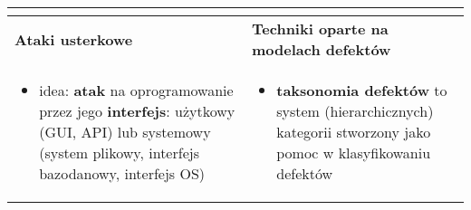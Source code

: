 \documentclass[../main.tex]{subfiles}
\begin{document}
\begin{table}[H]
\begin{center}
\begin{tabular}{| p{8cm} | p{8cm} |}
\begin{itemize}
                \end{itemize}\\
                \hline
                \hline
                \textbf{Ataki usterkowe} & \textbf{Techniki oparte na modelach defektów}\\
                \hline
                \begin{itemize}
                    \item idea: \textbf{atak} na oprogramowanie przez jego \textbf{interfejs}: użytkowy (GUI, API)
                    lub systemowy (system plikowy, interfejs bazodanowy, interfejs OS)
                \end{itemize}
                &
                \begin{itemize}
                    \item \textbf{taksonomia defektów} to system (hierarchicznych) kategorii
                    stworzony jako pomoc w klasyfikowaniu defektów
                \end{itemize}\\
                \hline
            \end{tabular}
        \end{center}
    \end{table}
\end{document}
